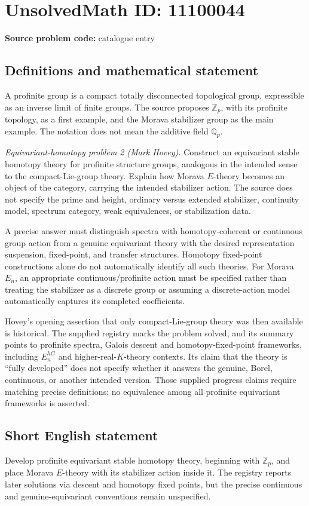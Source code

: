 \documentclass[11pt]{article}
\newcommand{\Z}{\mathbb{Z}}
\newcommand{\Q}{\mathbb{Q}}
\begin{document}
\section*{UnsolvedMath ID: 11100044}
\textbf{Source problem code:} catalogue entry
\subsection{Definitions and mathematical statement}
A profinite group is a compact totally disconnected topological group, expressible as an inverse limit of finite groups. The source proposes \(\Z_p\), with its profinite topology, as a first example, and the Morava stabilizer group as the main example. The notation does not mean the additive field \(\Q_p\).

\emph{Equivariant-homotopy problem 2 (Mark Hovey).} Construct an equivariant stable homotopy theory for profinite structure groups, analogous in the intended sense to the compact-Lie-group theory. Explain how Morava \(E\)-theory becomes an object of the category, carrying the intended stabilizer action. The source does not specify the prime and height, ordinary versus extended stabilizer, continuity model, spectrum category, weak equivalences, or stabilization data.

A precise answer must distinguish spectra with homotopy-coherent or continuous group action from a genuine equivariant theory with the desired representation suspension, fixed-point, and transfer structures. Homotopy fixed-point constructions alone do not automatically identify all such theories. For Morava \(E_n\), an appropriate continuous/profinite action must be specified rather than treating the stabilizer as a discrete group or assuming a discrete-action model automatically captures its completed coefficients.

Hovey's opening assertion that only compact-Lie-group theory was then available is historical. The supplied registry marks the problem solved, and its summary points to profinite spectra, Galois descent and homotopy-fixed-point frameworks, including \(E_n^{hG}\) and higher-real-\(K\)-theory contexts. Its claim that the theory is ``fully developed'' does not specify whether it answers the genuine, Borel, continuous, or another intended version. Those supplied progress claims require matching precise definitions; no equivalence among all profinite equivariant frameworks is asserted.
\subsection{Short English statement}
Develop profinite equivariant stable homotopy theory, beginning with \(\Z_p\), and place Morava \(E\)-theory with its stabilizer action inside it. The registry reports later solutions via descent and homotopy fixed points, but the precise continuous and genuine-equivariant conventions remain unspecified.
\end{document}
